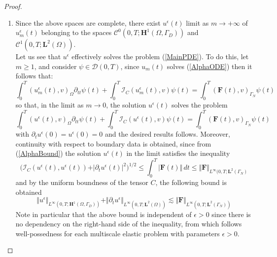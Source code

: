 \begin{proof}
\begin{enumerate}
    
    \item Since the above spaces are complete, there exist $u^{\epsilon}(t)$ limit as $m \longrightarrow +\infty$ of $u^{\epsilon}_m(t)$ belonging to the spaces $\mathcal{C}^0(0,T; \mathbf{H}^1(\Omega, \Gamma_D))$ and $\mathcal{C}^1(0,T; \mathbf{L}^2(\Omega))$.\\
    Let us see that $u^{\epsilon}$ effectively solves the problem (\ref{MainPDE}). To do this, let $m \geq 1$, and consider $\psi \in \mathcal{D}(0,T)$, since $u_m(t)$ solves (\ref{AlphaODE}) then it follows that:
    \begin{equation*}
        \int_0^T (u_m^{\epsilon}(t),v)_{\Omega} \partial_{tt}\psi(t) + \int_0^T \mathcal{I}_C (u_m^{\epsilon}(t),v) \psi(t)  = \int_0^T (\mathbf{F}(t),v)_{\Gamma_N} \psi(t) 
    \end{equation*}
    so that, in the limit as $m \longrightarrow 0$, the solution $u^{\epsilon}(t)$ solves the problem
    \begin{equation*}
        \int_0^T (u^{\epsilon}(t),v)_{\Omega} \partial_{tt}\psi(t) + \int_0^T \mathcal{I}_C (u^{\epsilon}(t),v) \psi(t) = \int_0^T (\mathbf{F}(t),v)_{\Gamma_N}\psi(t) 
    \end{equation*}
    with $\partial_t u^{\epsilon}(0) = u^{\epsilon}(0) = 0$ and the desired results follows. Moreover, continuity with respect to boundary data is obtained, since from (\ref{AlphaBound}) the solution $u^{\epsilon}(t)$ in the limit satisfies the inequality 
    \begin{equation*}
        \big( \mathcal{I}_C(u^{\epsilon}(t), u^{\epsilon}(t))+ \vert \partial_t u^{\epsilon}(t) \vert^2 \big)^{1/2} \leq \int_0^T \vert \mathbf{F}(t) \Vert \, dt \leq \Vert \mathbf{F}\Vert_{L^{\infty}(0,T;\mathbf{L}^2(\Gamma_N)}
    \end{equation*}
    and by the uniform boundness of the tensor $C$, the following bound is obtained
    \begin{equation*}
        \Vert u^{\epsilon} \Vert_{L^{\infty}(0,T;\mathbf{H}^1(\Omega, \Gamma_D))}  + \Vert \partial_t u^{\epsilon} \Vert_{L^{\infty}(0,T;\mathbf{L}^2(\Omega))} \lesssim \Vert \mathbf{F}\Vert_{L^{\infty}(0,T; \mathbf{L}^2(\Gamma_N))}
    \end{equation*}
    Note in particular that the above bound is independent of $\epsilon > 0$ since there is no dependency on the right-hand side of the inequality, from which follows well-possedness for each multiscale elastic problem with parameters $\epsilon > 0$.
\end{enumerate}

\end{proof}

